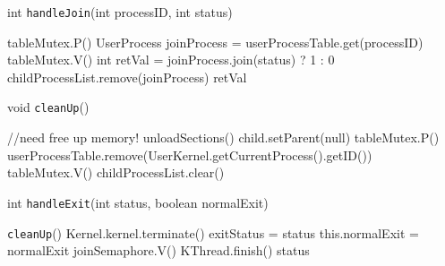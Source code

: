\documentclass{article}
\begin{document}
\begin{spacing}{1.1}
\begin{algorithm}
\caption{int \texttt{handleJoin}(int processID, int status)}
  \begin{algorithmic}
    \STATE \colorbox{myyellow}{tableMutex.P()}
    \STATE UserProcess joinProcess = userProcessTable.get(processID)
    \STATE \colorbox{myyellow}{tableMutex.V()}
    \ENDIF
    \STATE int retVal = joinProcess.join(status) ? 1 : 0
    \STATE childProcessList.remove(joinProcess)
    \RETURN retVal
  \end{algorithmic}
\end{algorithm}

\begin{algorithm}
\caption{void \texttt{cleanUp}()}
  \begin{algorithmic}
    \ENDIF
    \ENDFOR
    \STATE \colorbox{myyellow}{//need free up memory!}
    \STATE unloadSections()
      \STATE child.setParent(null)
    \ENDIF
    \ENDFOR
    \STATE \colorbox{myyellow}{tableMutex.P()}
    \STATE userProcessTable.remove(UserKernel.getCurrentProcess().getID())
    \STATE \colorbox{myyellow}{tableMutex.V()}
    \STATE childProcessList.clear()
  \end{algorithmic}
\end{algorithm}

\begin{algorithm}
\caption{int \texttt{handleExit}(int status, boolean normalExit)}
  \begin{algorithmic}
    \STATE \texttt{cleanUp}()
      \STATE Kernel.kernel.terminate()
    \ENDIF
    \STATE exitStatus = status
    \STATE this.normalExit = normalExit
    \STATE joinSemaphore.V()
    \STATE \colorbox{myyellow}{KThread.finish()}
    \RETURN status
  \end{algorithmic}
\end{algorithm}


\end{spacing}
\end{document}
